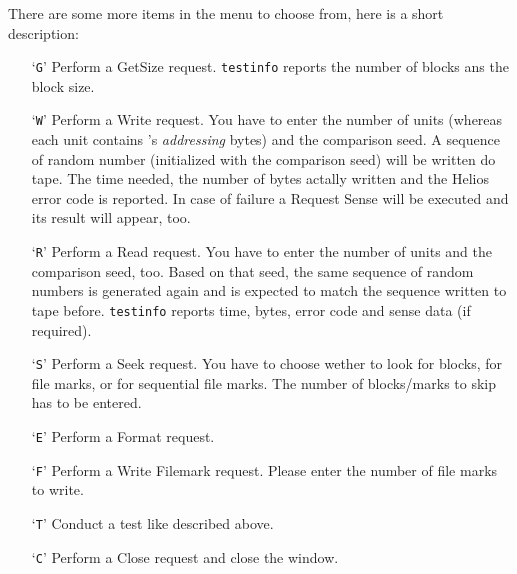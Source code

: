 

There are some more items in the menu to choose from, here is a short
description:

\begin{itemize}

  \item [`{\tt G}'] Perform a GetSize request. {\tt testinfo} reports the number
                  of blocks ans the block size.

  \item [`{\tt W}'] Perform a Write request. You have to enter the number of
                  units (whereas each unit contains \DI 's
                  {\it addressing} bytes) and the comparison seed. A sequence
                  of random number (initialized with the comparison seed) will
                  be written do tape. The time needed, the number of bytes
                  actally written and the Helios error code is reported. In
                  case of failure a Request Sense will be executed and its
                  result will appear, too.

  \item [`{\tt R}'] Perform a Read request. You have to enter the number of
                  units and the comparison seed, too. Based on that seed, the
                  same sequence of random numbers is generated again and is
                  expected to match the sequence written to tape before.
                  {\tt testinfo} reports time, bytes, error code and sense
                  data (if required).

  \item [`{\tt S}'] Perform a Seek request. You have to choose wether to look
                  for blocks, for file marks, or for sequential file marks.
                  The number of blocks/marks to skip has to be entered.

  \item [`{\tt E}'] Perform a Format request.

  \item [`{\tt F}'] Perform a Write Filemark request. Please enter the number
                  of file marks to write.

  \item [`{\tt T}'] Conduct a test like described above.

  \item [`{\tt C}'] Perform a Close request and close the window.

\end{itemize}

